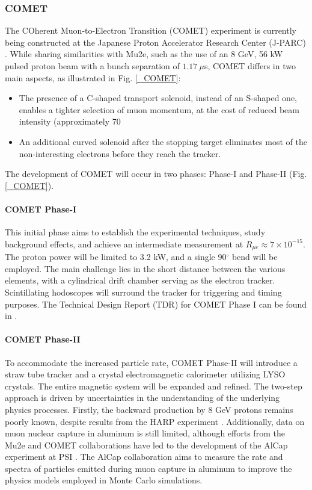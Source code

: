 \begin{refsection}
        \subsubsection{COMET}
        The COherent Muon-to-Electron Transition (COMET) experiment is currently being constructed at the Japanese Proton Accelerator Research Center (J-PARC) \cite{COMET_I}. 
While sharing similarities with Mu2e, such as the use of an 8 GeV, 56 kW pulsed proton beam with a bunch separation of $1.17\ \mu$s, COMET differs in two main aspects, as illustrated in Fig. \ref{_COMET}:
\begin{itemize}
    \item The presence of a C-shaped transport solenoid, instead of an S-shaped one, enables a tighter selection of muon momentum, at the cost of reduced beam intensity (approximately 70%
    \item An additional curved solenoid after the stopping target eliminates most of the non-interesting electrons before they reach the tracker.
\end{itemize}
The development of COMET will occur in two phases: Phase-I and Phase-II (Fig. \ref{_COMET}).
\paragraph{COMET Phase-I}
This initial phase aims to establish the experimental techniques, study background effects, and achieve an intermediate measurement at $R_{\mu e}\approx7\times10^{-15}$. The proton power will be limited to 3.2 kW, and a single 90$^\circ$ bend will be employed. The main challenge lies in the short distance between the various elements, with a cylindrical drift chamber serving as the electron tracker. Scintillating hodoscopes will surround the tracker for triggering and timing purposes. The Technical Design Report (TDR) for COMET Phase I can be found in \cite{COMET_I}.
\paragraph{COMET Phase-II}
To accommodate the increased particle rate, COMET Phase-II will introduce a straw tube tracker and a crystal electromagnetic calorimeter utilizing LYSO crystals. The entire magnetic system will be expanded and refined.
The two-step approach is driven by uncertainties in the understanding of the underlying physics processes. Firstly, the backward production by 8 GeV protons remains poorly known, despite results from the HARP experiment \cite{HARP}. Additionally, data on muon nuclear capture in aluminum is still limited, although efforts from the Mu2e and COMET collaborations have led to the development of the AlCap experiment at PSI \cite{Edmonds:2015}\cite{AlCap:2015}\cite{AlCap:2018}. The AlCap collaboration aims to measure the rate and spectra of particles emitted during muon capture in aluminum to improve the physics models employed in Monte Carlo simulations.


\end{refsection}
